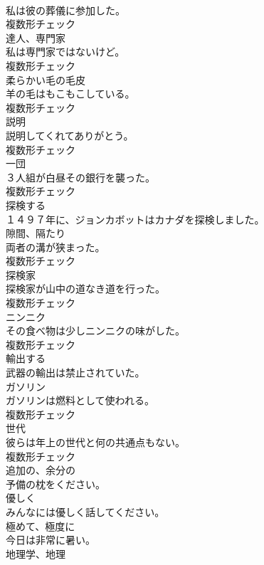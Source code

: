 \documentclass[8pt]{extreport}
\begin{document}
\begin{CJK}{UTF8}{min}
\\	私は彼の葬儀に参加した。	
\\	複数形チェック
\\	[名詞]	達人、専門家	
\\	私は専門家ではないけど。	
\\	複数形チェック
\\	[名詞]	柔らかい毛の毛皮	
\\	羊の毛はもこもこしている。	
\\	複数形チェック
\\	[名詞]	説明	
\\	説明してくれてありがとう。	
\\	複数形チェック
\\	[名詞]	一団	
\\	３人組が白昼その銀行を襲った。	
\\	複数形チェック
\\	[動詞]	探検する	
\\	１４９７年に、ジョンカボットはカナダを探検しました。	
\\	[名詞]	隙間、隔たり	
\\	両者の溝が狭まった。	
\\	複数形チェック
\\	[名詞]	探検家	
\\	探検家が山中の道なき道を行った。	
\\	複数形チェック
\\	[名詞]	ニンニク	
\\	その食べ物は少しニンニクの味がした。	
\\	複数形チェック
\\	[動詞]	輸出する	
\\	武器の輸出は禁止されていた。	
\\	[名詞]	ガソリン	
\\	ガソリンは燃料として使われる。	
\\	複数形チェック
\\	[名詞]	世代	
\\	彼らは年上の世代と何の共通点もない。	
\\	複数形チェック
\\	[形容詞]	追加の、余分の	
\\	予備の枕をください。	
\\	[副詞]	優しく	
\\	みんなには優しく話してください。	
\\	[副詞]	極めて、極度に	
\\	今日は非常に暑い。	
\\	[名詞]	地理学、地理	

\end{CJK}
\end{document}
